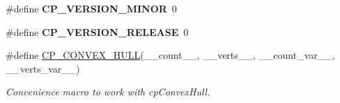 \begin{DoxyCompactItemize}
\item 
\hypertarget{group__misc_ga015d989acd6a013e84ea8696953172a8}{}\#define {\bfseries C\+P\+\_\+\+V\+E\+R\+S\+I\+O\+N\+\_\+\+M\+I\+N\+O\+R}~0\label{group__misc_ga015d989acd6a013e84ea8696953172a8}

\item 
\hypertarget{group__misc_ga0311c28764c81d74c3c76570bb92c57f}{}\#define {\bfseries C\+P\+\_\+\+V\+E\+R\+S\+I\+O\+N\+\_\+\+R\+E\+L\+E\+A\+S\+E}~0\label{group__misc_ga0311c28764c81d74c3c76570bb92c57f}

\item 
\#define \hyperlink{group__misc_ga9abe29a1fe6d1f2041e95f2fb2e2ce1c}{C\+P\+\_\+\+C\+O\+N\+V\+E\+X\+\_\+\+H\+U\+L\+L}(\+\_\+\+\_\+count\+\_\+\+\_\+,  \+\_\+\+\_\+verts\+\_\+\+\_\+,  \+\_\+\+\_\+count\+\_\+var\+\_\+\+\_\+,  \+\_\+\+\_\+verts\+\_\+var\+\_\+\+\_\+)
\begin{DoxyCompactList}\small\item\em Convenience macro to work with cp\+Convex\+Hull. \end{DoxyCompactList}\end{DoxyCompactItemize}
